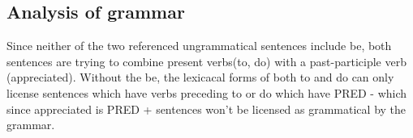 \documentclass{article}
\begin{document}
\subsection{Analysis of grammar}
Since neither of the two referenced ungrammatical sentences include be, both sentences are trying to combine present verbs(to, do) with a past-participle verb (appreciated). Without the be, the lexicacal forms of both to and do can only license sentences which have verbs preceding to or do which have PRED - which since appreciated is PRED + sentences won't be licensed as grammatical by the grammar. 
\end{document}
